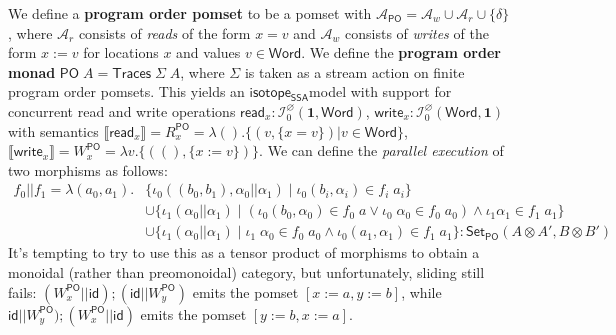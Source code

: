\documentclass[acmsmall,screen,review]{acmart}
\newcommand{\mc}[1]{\ensuremath{\mathcal{#1}}}
\newcommand{\mb}[1]{\ensuremath{\mathbf{#1}}}
\newcommand{\ms}[1]{\ensuremath{\mathsf{#1}}}
\newcommand{\dnt}[1]{\llbracket{#1}\rrbracket}
\newcommand{\isotopessa}{\ms{isotope_{SSA}}}
\begin{document}
We define a \textbf{program order pomset} to be a pomset with \(\mc{A}_{\ms{PO}}
= \mc{A}_w \cup \mc{A}_r \cup \{\delta\}\), where \(\mc{A}_r\) consists of
\textit{reads} of the form \(x = v\) and \(\mc{A}_w\) consists of
\textit{writes} of the form \(x := v\) for locations \(x\) and values \(v \in
\ms{Word}\). We define the \textbf{program order monad} \(\ms{PO}\;A =
\ms{Traces}\;\Sigma\;A\), where \(\Sigma\) is taken as a stream action on finite
program order pomsets. This yields an \isotopessa model with support for
concurrent read and write operations \(\ms{read}_x: \mc{I}^\varnothing_0(\mb{1},
\ms{Word})\), \(\ms{write}_x: \mc{I}^\varnothing_0(\ms{Word}, \mb{1})\) with
semantics
\(
  \dnt{\ms{read}_x} = R_x^{\ms{PO}} = \lambda (). \{(v, \{x = v\}) | v \in \ms{Word}\}
\),
\(
  \dnt{\ms{write}_x} = W_x^{\ms{PO}} =  \lambda v. \{((), \{x := v\})\}
\).
We can define the \textit{parallel execution} of two morphisms as follows:
\begin{equation}
  \begin{aligned}
  f_0 || f_1 = \lambda (a_0, a_1). 
  & \{\iota_0 ((b_0, b_1), \alpha_0 || \alpha_1) 
    \mid \iota_0 (b_i, \alpha_i) \in f_i\;a_i\} 
  \\ & \cup \{\iota_1 (\alpha_0 || \alpha_1) \mid (\iota_0 (b_0, \alpha_0) \in f_0\;a \lor \iota_0\;\alpha_0 \in f_0\;a_0) \land \iota_1 \alpha_1 \in f_1\;a_1\} 
  \\ & \cup \{\iota_1 (\alpha_0 || \alpha_1) \mid \iota_1\;\alpha_0 \in f_0\;a_0 \land \iota_0 (a_1, \alpha_1) \in f_1\;a_1\}: \ms{Set}_{\ms{PO}}(A \otimes A', B \otimes B')
  \end{aligned}
\end{equation}
It's tempting to try to use this as a tensor product of morphisms to obtain a
monoidal (rather than preomonoidal) category, but unfortunately, sliding still
fails: \((W_x^{\ms{PO}} || \ms{id}) ; (\ms{id} || W_y^{\ms{PO}})\) emits the
pomset \([x := a, y := b]\), while \(\ms{id} || W_y^{\ms{PO}}) ; (W_x^{\ms{PO}}
|| \ms{id})\) emits the pomset \([y := b, x := a]\). 
\end{document}
